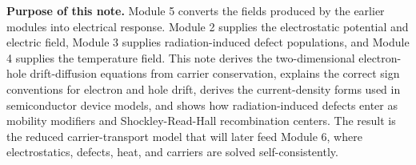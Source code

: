\documentclass[11pt]{article}
\begin{document}

\begin{overviewbox}
\textbf{Purpose of this note.} Module 5 converts the fields produced by the earlier modules into electrical response. Module 2 supplies the electrostatic potential and electric field, Module 3 supplies radiation-induced defect populations, and Module 4 supplies the temperature field. This note derives the two-dimensional electron-hole drift-diffusion equations from carrier conservation, explains the correct sign conventions for electron and hole drift, derives the current-density forms used in semiconductor device models, and shows how radiation-induced defects enter as mobility modifiers and Shockley-Read-Hall recombination centers. The result is the reduced carrier-transport model that will later feed Module 6, where electrostatics, defects, heat, and carriers are solved self-consistently.
\end{overviewbox}

\ProjectTOC
\end{document}
